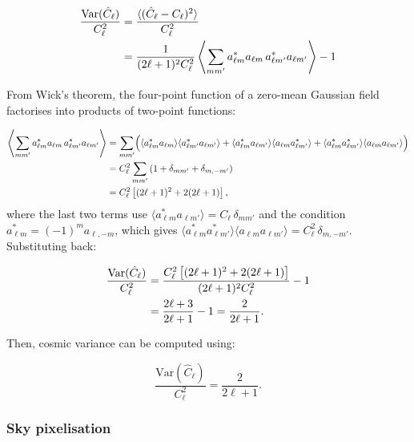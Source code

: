 \documentclass[../../thesis.tex]{subfiles}
\begin{document}
\begin{align}
    \frac{\mathrm{Var}(\hat{C}_{\ell})}{C_{\ell}^2} \notag
    &= \frac{\langle (\hat{C}_{\ell} - C_{\ell})^2 \rangle}{C_{\ell}^2} \notag \\
    &= \frac{1}{(2\ell+1)^2 C_{\ell}^2}
    \left\langle \sum_{m m'} a_{\ell m}^* a_{\ell m} \, a_{\ell m'}^* a_{\ell m'} \right\rangle - 1 \notag \\
\end{align}

From Wick's theorem, the four-point function of a zero-mean Gaussian field factorises into products of two-point functions:

\begin{align}
    \left\langle \sum_{m m'} a_{\ell m}^* a_{\ell m} \, a_{\ell m'}^* a_{\ell m'} \right\rangle
    &= \sum_{m m'} \Bigl(
        \langle a_{\ell m}^* a_{\ell m} \rangle \langle a_{\ell m'}^* a_{\ell m'} \rangle
      + \langle a_{\ell m}^* a_{\ell m'} \rangle \langle a_{\ell m} a_{\ell m'}^* \rangle
      + \langle a_{\ell m}^* a_{\ell m'}^* \rangle \langle a_{\ell m} a_{\ell m'} \rangle
    \Bigr) \notag \\
    &= C_{\ell}^2 \sum_{m m'} \left(1 + \delta_{m m'} + \delta_{m,-m'}\right) \notag \\
    &= C_{\ell}^2 \left[(2\ell+1)^2 + 2(2\ell+1)\right],
\end{align}
where the last two terms use $\langle a_{\ell m}^* a_{\ell m'} \rangle = C_\ell\,\delta_{mm'}$ and the condition $a_{\ell m}^* = (-1)^m a_{\ell,-m}$, which gives $\langle a_{\ell m}^* a_{\ell m'}^* \rangle \langle a_{\ell m} a_{\ell m'} \rangle = C_\ell^2\,\delta_{m,-m'}$. Substituting back:

\begin{align}
    \frac{\mathrm{Var}(\hat{C}_{\ell})}{C_{\ell}^2}
    &= \frac{C_{\ell}^2\left[(2\ell+1)^2 + 2(2\ell+1)\right]}{(2\ell+1)^2 C_{\ell}^2} - 1 \notag \\
    &= \frac{2\ell+3}{2\ell+1} - 1 = \frac{2}{2\ell+1}. \notag
\end{align}

Then, cosmic variance can be computed using:

\begin{equation} \label{eq:cosmic_variance}
    \frac{\mathrm{Var}(\hat{C}_{\ell})}{C_{\ell}^2} = \frac{2}{2\ell+1}.
\end{equation}

\subsubsection{Sky pixelisation}
\end{document}
